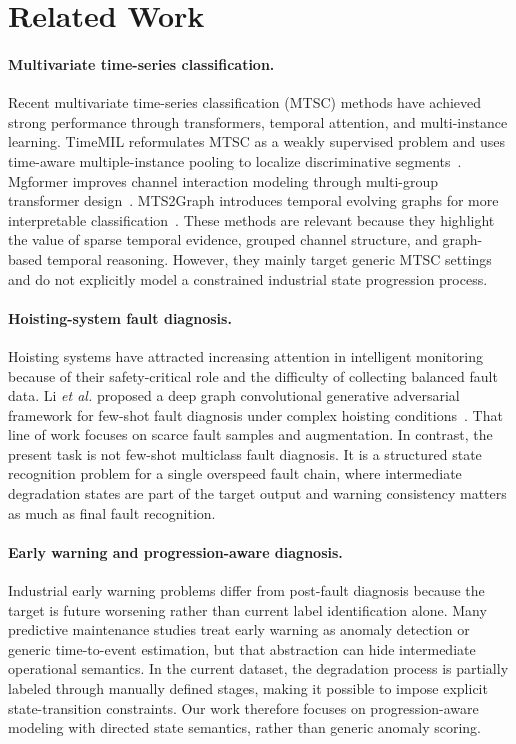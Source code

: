 \section{Related Work}
\label{sec:related}

\paragraph{Multivariate time-series classification.}
Recent multivariate time-series classification (MTSC) methods have achieved strong performance through transformers, temporal attention, and multi-instance learning. TimeMIL reformulates MTSC as a weakly supervised problem and uses time-aware multiple-instance pooling to localize discriminative segments~\cite{pmlr-v235-chen24af}. Mgformer improves channel interaction modeling through multi-group transformer design~\cite{zhang2024mgformer}. MTS2Graph introduces temporal evolving graphs for more interpretable classification~\cite{demertzis2024mts2graph}. These methods are relevant because they highlight the value of sparse temporal evidence, grouped channel structure, and graph-based temporal reasoning. However, they mainly target generic MTSC settings and do not explicitly model a constrained industrial state progression process.

\paragraph{Hoisting-system fault diagnosis.}
Hoisting systems have attracted increasing attention in intelligent monitoring because of their safety-critical role and the difficulty of collecting balanced fault data. Li \emph{et al.} proposed a deep graph convolutional generative adversarial framework for few-shot fault diagnosis under complex hoisting conditions~\cite{li2025hoistingdgcgan}. That line of work focuses on scarce fault samples and augmentation. In contrast, the present task is not few-shot multiclass fault diagnosis. It is a structured state recognition problem for a single overspeed fault chain, where intermediate degradation states are part of the target output and warning consistency matters as much as final fault recognition.

\paragraph{Early warning and progression-aware diagnosis.}
Industrial early warning problems differ from post-fault diagnosis because the target is future worsening rather than current label identification alone. Many predictive maintenance studies treat early warning as anomaly detection or generic time-to-event estimation, but that abstraction can hide intermediate operational semantics. In the current dataset, the degradation process is partially labeled through manually defined stages, making it possible to impose explicit state-transition constraints. Our work therefore focuses on progression-aware modeling with directed state semantics, rather than generic anomaly scoring.


